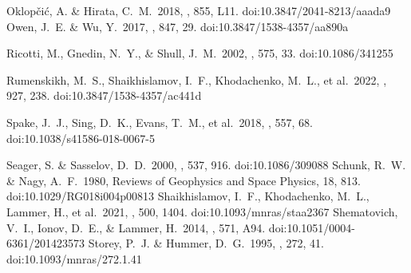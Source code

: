 \documentclass[journal, onecolumn]{aastex631}
\begin{document}
\begin{CJK*}{UTF8}{gbsn}
\begin{thebibliography}{99}
 Oklop{\v{c}}i{\'c}, A. \& Hirata, C.~M.\ 2018, \apjl, 855, L11. doi:10.3847/2041-8213/aaada9
Owen, J.~E. \& Wu, Y.\ 2017, \apj, 847, 29. doi:10.3847/1538-4357/aa890a



 Ricotti, M., Gnedin, N.~Y., \& Shull, J.~M.\ 2002, \apj, 575, 33. doi:10.1086/341255

 Rumenskikh, M.~S., Shaikhislamov, I.~F., Khodachenko, M.~L., et al.\ 2022, \apj, 927, 238. doi:10.3847/1538-4357/ac441d


 Spake, J.~J., Sing, D.~K., Evans, T.~M., et al.\ 2018, \nat, 557, 68. doi:10.1038/s41586-018-0067-5


 Seager, S. \& Sasselov, D.~D.\ 2000, \apj, 537, 916. doi:10.1086/309088
 Schunk, R.~W. \& Nagy, A.~F.\ 1980, Reviews of Geophysics and Space Physics, 18, 813. doi:10.1029/RG018i004p00813
 Shaikhislamov, I.~F., Khodachenko, M.~L., Lammer, H., et al.\ 2021, \mnras, 500, 1404. doi:10.1093/mnras/staa2367
 Shematovich, V.~I., Ionov, D.~E., \& Lammer, H.\ 2014, \aap, 571, A94. doi:10.1051/0004-6361/201423573
 Storey, P.~J. \& Hummer, D.~G.\ 1995, \mnras, 272, 41. doi:10.1093/mnras/272.1.41


\end{thebibliography}
\end{CJK*}
\end{document}
